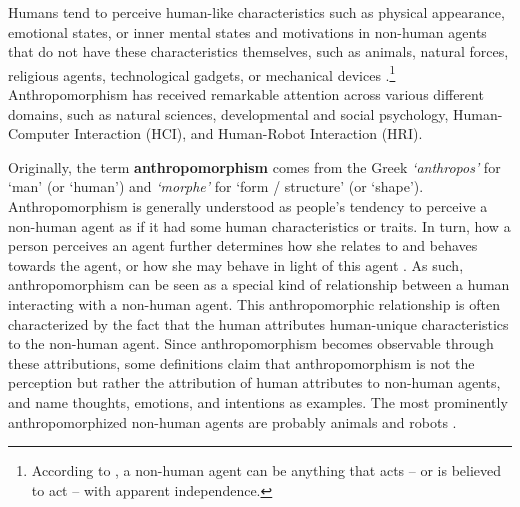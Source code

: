 \documentclass{frontiersSCNS} %
\begin{document}
Humans tend to perceive human-like characteristics such as physical appearance, emotional states, or inner mental states and motivations in non-human agents that do not have these characteristics themselves, such as animals, natural forces, religious agents, technological gadgets, or mechanical devices \citep{epley_when_2008}.\footnote{According to \cite{epley_when_2008}, a non-human agent can be anything that acts -- or is believed to act -- with apparent independence.}  Anthropomorphism has received remarkable attention across various different domains, such as natural sciences, developmental and social psychology, Human-Computer Interaction (HCI), and Human-Robot Interaction (HRI).

Originally, the term \textbf{anthropomorphism} comes from the Greek \textit{`anthropos'} for `man' (or `human') and \textit{`morphe'} for `form / structure' (or `shape'). Anthropomorphism is generally understood as people's tendency to perceive a non-human agent as if it had some human characteristics or traits. In turn, how a person perceives an agent further determines how she relates to and behaves towards the agent, or how she may behave in light of this agent \citep{epley_when_2008}.
As such, anthropomorphism can be seen as a special kind of relationship between a human interacting with a non-human agent. This anthropomorphic relationship is often characterized by the fact that the human attributes human-unique characteristics to the non-human agent. Since anthropomorphism becomes observable through these attributions, some definitions claim that anthropomorphism is not the perception but rather the attribution of human attributes to non-human agents, and name thoughts, emotions, and intentions as examples. The most prominently anthropomorphized non-human agents are probably animals and robots \citep{duffy_anthropomorphism_2003,schmitz_concepts_2011}.
\end{document}
